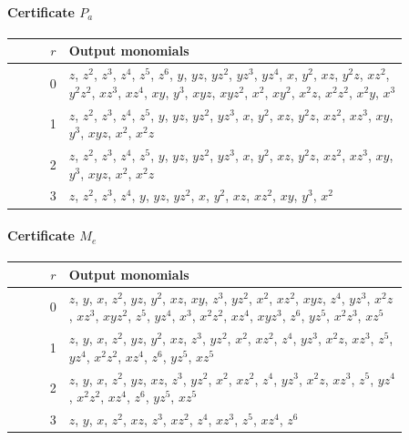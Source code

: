 \documentclass[11pt]{amsart}
\theoremstyle{definition}
\theoremstyle{remark}
\numberwithin{equation}{section}
\begin{document}
\paragraph*{Certificate $P_a$}
\begin{center}
\begin{tabular}{rp{0.86\linewidth}}
$r$ & Output monomials\\\hline
0 & \(z\), \(z^{2}\), \(z^{3}\), \(z^{4}\), \(z^{5}\), \(z^{6}\), \(y\), \(yz\), \(yz^{2}\), \(yz^{3}\), \(yz^{4}\), \(x\), \(y^{2}\), \(xz\), \(y^{2}z\), \(xz^{2}\), \(y^{2}z^{2}\), \(xz^{3}\), \(xz^{4}\), \(xy\), \(y^{3}\), \(xyz\), \(xyz^{2}\), \(x^{2}\), \(xy^{2}\), \(x^{2}z\), \(x^{2}z^{2}\), \(x^{2}y\), \(x^{3}\)\\
1 & \(z\), \(z^{2}\), \(z^{3}\), \(z^{4}\), \(z^{5}\), \(y\), \(yz\), \(yz^{2}\), \(yz^{3}\), \(x\), \(y^{2}\), \(xz\), \(y^{2}z\), \(xz^{2}\), \(xz^{3}\), \(xy\), \(y^{3}\), \(xyz\), \(x^{2}\), \(x^{2}z\)\\
2 & \(z\), \(z^{2}\), \(z^{3}\), \(z^{4}\), \(z^{5}\), \(y\), \(yz\), \(yz^{2}\), \(yz^{3}\), \(x\), \(y^{2}\), \(xz\), \(y^{2}z\), \(xz^{2}\), \(xz^{3}\), \(xy\), \(y^{3}\), \(xyz\), \(x^{2}\), \(x^{2}z\)\\
3 & \(z\), \(z^{2}\), \(z^{3}\), \(z^{4}\), \(y\), \(yz\), \(yz^{2}\), \(x\), \(y^{2}\), \(xz\), \(xz^{2}\), \(xy\), \(y^{3}\), \(x^{2}\)\\
\end{tabular}
\end{center}

\paragraph*{Certificate $M_e$}
\begin{center}
\begin{tabular}{rp{0.86\linewidth}}
$r$ & Output monomials\\\hline
0 & \(z\), \(y\), \(x\), \(z^{2}\), \(yz\), \(y^{2}\), \(xz\), \(xy\), \(z^{3}\), \(yz^{2}\), \(x^{2}\), \(xz^{2}\), \(xyz\), \(z^{4}\), \(yz^{3}\), \(x^{2}z\), \(xz^{3}\), \(xyz^{2}\), \(z^{5}\), \(yz^{4}\), \(x^{3}\), \(x^{2}z^{2}\), \(xz^{4}\), \(xyz^{3}\), \(z^{6}\), \(yz^{5}\), \(x^{2}z^{3}\), \(xz^{5}\)\\
1 & \(z\), \(y\), \(x\), \(z^{2}\), \(yz\), \(y^{2}\), \(xz\), \(z^{3}\), \(yz^{2}\), \(x^{2}\), \(xz^{2}\), \(z^{4}\), \(yz^{3}\), \(x^{2}z\), \(xz^{3}\), \(z^{5}\), \(yz^{4}\), \(x^{2}z^{2}\), \(xz^{4}\), \(z^{6}\), \(yz^{5}\), \(xz^{5}\)\\
2 & \(z\), \(y\), \(x\), \(z^{2}\), \(yz\), \(xz\), \(z^{3}\), \(yz^{2}\), \(x^{2}\), \(xz^{2}\), \(z^{4}\), \(yz^{3}\), \(x^{2}z\), \(xz^{3}\), \(z^{5}\), \(yz^{4}\), \(x^{2}z^{2}\), \(xz^{4}\), \(z^{6}\), \(yz^{5}\), \(xz^{5}\)\\
3 & \(z\), \(y\), \(x\), \(z^{2}\), \(xz\), \(z^{3}\), \(xz^{2}\), \(z^{4}\), \(xz^{3}\), \(z^{5}\), \(xz^{4}\), \(z^{6}\)\\
\end{tabular}
\end{center}
\end{document}
